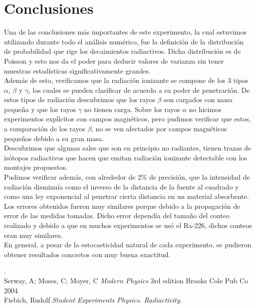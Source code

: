 \documentclass[%
 reprint,
 amsmath,amssymb,
 aps,
]{revtex4-1}
\begin{document}
\section{\label{sec:level1}Conclusiones}
Una de las conclusiones más importantes de este experimento, la cual estuvimos utilizando durante todo el análisis numérico, fue la definición de la distribución de probabilidad que rige los decaimientos radiactivos. Dicha distribución es de Poisson y esto nos da el poder para deducir valores de varianza sin tener muestras estadísticas significativamente grandes.\\

Además de esto, verificamos que la radiación ionizante se compone de los 3 tipos $\alpha$, $\beta$ y $\gamma$, los cuales se pueden clasificar de acuerdo a su poder de penetración. De estos tipos de radiación descubrimos que los rayos $\beta$ son cargados con masa pequeña y que los rayos $\gamma$ no tienen carga. Sobre los rayos $\alpha$ no hicimos experimentos explícitos con campos magnéticos, pero pudimos verificar que estos, a comparación de los rayos  $\beta$, no se ven afectados por campos magnéticos pequeños debido a su gran masa.\\

Descubrimos que algunas sales que son en principio no radiantes, tienen trazas de isótopos radiactivos que hacen que emitan radiación ionizante detectable con los montajes propuestos.\\

Pudimos verificar además, con alrededor de 2\% de precisión, que la intensidad de radiación disminuía como el inverso de la distancia de la fuente al cuadrado y como una ley exponencial al penetrar cierta distancia en un material absorbente.\\

Los errores obtenidos fueron muy similares porque debido a la propagación de error de las medidas tomadas. Dicho error dependía del tamaño del conteo realizado y debido a que en muchos experimentos se usó el Ra-226, dichos conteos eran muy similares.\\

En general, a pesar de la estocasticidad natural de cada experimento, se pudieron obtener resultados concretos con muy buena exactitud.\\




\begin{thebibliography}{99} 
.\\ 
Serway, A; Moses, C; Moyer, C {\it Modern Physics} { 3rd edition} { Brooks Cole Pub Co} { 2004} \\
 Fiebich, Rudolf.{\it Student Experiments Physics. Radiactivity}.\\ 
\end{thebibliography}
\end{document}
